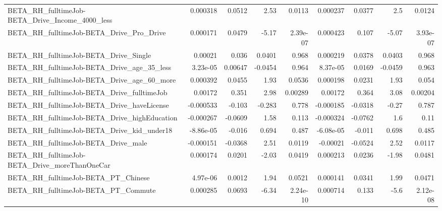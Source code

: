 \begin{tabular}{lrrrrrrrr}
BETA\_RH\_fulltimeJob-BETA\_Drive\_Income\_4000\_less    &    0.000318 &       0.0512 &      2.53 &   0.0113 &   0.000237 &      0.0377 &          2.5 &        0.0124 \\
BETA\_RH\_fulltimeJob-BETA\_Drive\_Pro\_Drive           &    0.000171 &       0.0479 &     -5.17 & 2.39e-07 &   0.000423 &       0.107 &        -5.07 &      3.93e-07 \\
BETA\_RH\_fulltimeJob-BETA\_Drive\_Single              &     0.00021 &        0.036 &    0.0401 &    0.968 &   0.000219 &      0.0378 &       0.0403 &         0.968 \\
BETA\_RH\_fulltimeJob-BETA\_Drive\_age\_35\_less         &    3.23e-05 &      0.00647 &   -0.0454 &    0.964 &   8.37e-05 &      0.0169 &      -0.0459 &         0.963 \\
BETA\_RH\_fulltimeJob-BETA\_Drive\_age\_60\_more         &    0.000392 &       0.0455 &      1.93 &   0.0536 &   0.000198 &      0.0231 &         1.93 &         0.054 \\
BETA\_RH\_fulltimeJob-BETA\_Drive\_fulltimeJob         &     0.00172 &        0.351 &      2.98 &  0.00289 &    0.00172 &       0.364 &         3.08 &       0.00204 \\
BETA\_RH\_fulltimeJob-BETA\_Drive\_haveLicense         &   -0.000533 &       -0.103 &    -0.283 &    0.778 &  -0.000185 &     -0.0318 &        -0.27 &         0.787 \\
BETA\_RH\_fulltimeJob-BETA\_Drive\_highEducation       &   -0.000267 &      -0.0609 &      1.58 &    0.113 &  -0.000324 &     -0.0762 &          1.6 &          0.11 \\
BETA\_RH\_fulltimeJob-BETA\_Drive\_kid\_under18         &   -8.86e-05 &       -0.016 &     0.694 &    0.487 &  -6.08e-05 &      -0.011 &        0.698 &         0.485 \\
BETA\_RH\_fulltimeJob-BETA\_Drive\_male                &   -0.000151 &      -0.0368 &      2.51 &   0.0119 &   -0.00021 &     -0.0524 &         2.52 &        0.0117 \\
BETA\_RH\_fulltimeJob-BETA\_Drive\_moreThanOneCar      &    0.000174 &       0.0201 &     -2.03 &   0.0419 &   0.000213 &      0.0236 &        -1.98 &        0.0481 \\
BETA\_RH\_fulltimeJob-BETA\_PT\_Chinese                &    4.97e-06 &       0.0012 &      1.94 &   0.0521 &   0.000141 &      0.0341 &         1.99 &        0.0471 \\
BETA\_RH\_fulltimeJob-BETA\_PT\_Commute                &    0.000285 &       0.0693 &     -6.34 & 2.24e-10 &   0.000714 &       0.133 &         -5.6 &      2.12e-08 \\

\end{tabular}
